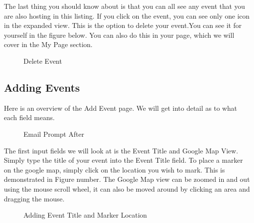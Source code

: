 \documentclass[10pt]{article}
\newcommand{\fancysub}[2] {{\color{primary}\subsection{#1} \label{sec:#2}}}
\begin{document}
			The last thing you should know about is that you can all see any event that you are also hosting in this listing. If you click on the event, you can see only one icon in the expanded view. This is the option to delete your event.You can see it for yourself in the figure below. You can also do this in your page, which we will cover in the My Page section.
			
			\begin{figure}[H]
				\centering
				\caption{Delete  Event}
				\label{fig:awesome_image}
			\end{figure}			
			
		\clearpage
		\fancysub{Adding Events}{addevent}
			Here is an overview of the Add Event page. We will get into detail as to what each field means.
			\begin{figure}[H]
				\centering
				\caption{Email Prompt After}
				\label{fig:awesome_image}
			\end{figure}
			
			The first input fields we will look at is the Event Title and Google Map View. Simply type the title of your event into the Event Title field. To place a marker on the google map, simply click on the location you wish to mark. This is demonstrated in Figure number. The Google Map view can be zoomed in and out using the mouse scroll wheel, it can also be moved around by clicking an area and dragging the mouse.

			\begin{figure}[H]
				\centering
				\caption{Adding Event Title and Marker Location}
				\label{fig:awesome_image}
			\end{figure}
\end{document}
